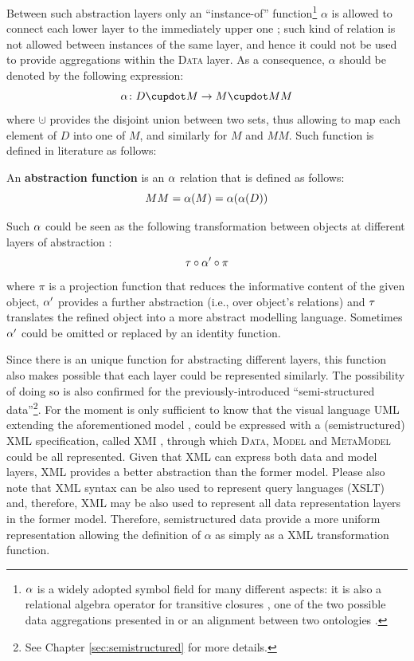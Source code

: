 Between such abstraction layers only an ``instance-of'' function\footnote{$\abstr$ is a widely adopted symbol field for many different aspects: it is also a relational algebra operator for transitive closures \cite{Alpha}, one of the two possible data aggregations presented in \cite{Johnson2011} or an alignment between two ontologies \cite{euzenat2013d}.} $\alpha$ is allowed to connect  each lower layer to the  immediately upper one \cite{mathmeta}; such kind of relation is not allowed  between instances of the same layer, and hence it could not be used to provide aggregations within the \textsc{Data} layer. As a consequence, $\alpha$ should be denoted by the following expression:
\[\abstr\colon \data\cupdot \model \to \model\cupdot \metamodel\]
where $\cupdot$ provides the disjoint union between two sets, thus allowing to map each element of $D$ into one of $M$, and similarly for $M$ and $MM$. Such function is defined in literature as follows:

\begin{definition}
	An \textbf{abstraction function} is an $\abstrTHIS$   relation that is
	defined as follows:
	\begin{equation}\label{eq:alayer}\metamodel=\abstr(\model)=\abstr(\abstr(\data))\end{equation}

	Such $\abstr$ could be seen as the following transformation between
	objects at different layers of abstraction \cite{kuhne06a}:
	\begin{equation}\label{eq:alpha}
	\ttransl \circ\abstr'\circ\pi
	\end{equation}
	where $\pi$ is a projection function that reduces the informative content of the
	given object, $\abstr'$ provides a further abstraction (i.e.,\; over object's
	relations) and $\ttransl$ translates the refined object into a more abstract
	modelling language. Sometimes \cite{kuhne06a} $\abstr'$ could be omitted or
	replaced by an identity function.
\end{definition}

Since there is an unique function for abstracting different layers, this function also makes possible that each layer could be represented similarly. The possibility of doing so is also confirmed for the previously-introduced  ``semi-structured data''\footnote{See Chapter \vref{sec:semistructured} for more details.}. For the moment is only sufficient to know that the visual language UML extending the aforementioned model \cite{OMG2011,OMG2011a}, could be expressed with a (semistructured) XML specification, called XMI \cite{XMI}, through which \textsc{Data}, \textsc{Model} and \textsc{MetaModel} could be all represented. Given that XML can express both data and model layers, XML provides a better abstraction than the former model. Please also note that XML syntax can be also used to represent query languages (XSLT) and, therefore, XML may be also used to represent all data representation layers in the former model. Therefore, semistructured data provide a more uniform representation allowing the definition of $\alpha$ as simply as a XML transformation function. 


